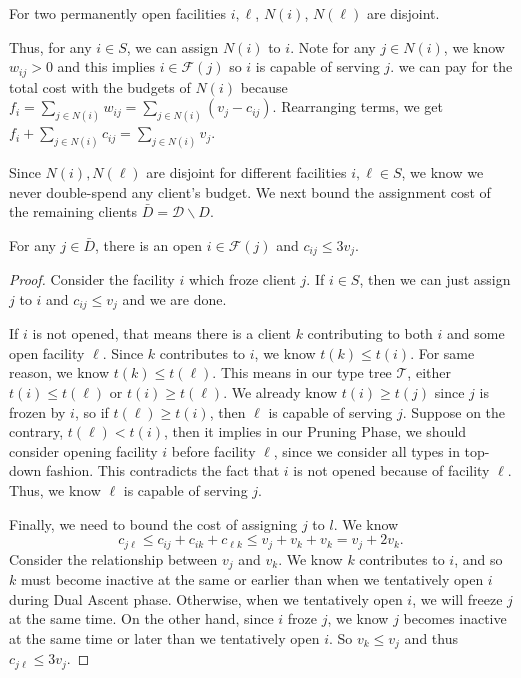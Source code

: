 \begin{fact}
For two permanently open facilities $i, \ell$, $N(i)$, $N(\ell)$ are disjoint.
\end{fact}

Thus, for any $i \in S$, we can assign $N(i)$ to $i$.
Note for any $j \in N(i)$, we know $w_{ij} > 0$ and this implies $i \in \mathcal{F}(j)$ so $i$ is capable of serving $j$.
we can pay for the total cost with the budgets of $N(i)$ because
%
$f_i = \sum_{j \in N(i)} w_{ij} = \sum_{j \in N(i)} (v_j - c_{ij})$.
%
Rearranging terms, we get
%
$f_i + \sum_{j \in N(i)} c_{ij} = \sum_{j \in N(i)} v_j$.

Since $N(i), N(\ell)$ are disjoint for different facilities $i, \ell \in S$, we know we never double-spend any client's budget.
%
We next bound the assignment cost of the remaining clients $\bar D = \mathcal{D} \backslash D$.
\begin{lem}
For any $j \in \bar D$, there is an open $i \in \mathcal{F}(j)$ and $c_{ij} \le 3v_j$.
\end{lem}
\begin{proof}
Consider the facility $i$ which froze client $j$. If $i \in S$, then we can just assign $j$ to $i$ and $c_{ij} \le v_j$ and we are done.

If $i$ is not opened, that means there is a client $k$ contributing to both $i$ and some open facility $\ell$. Since $k$ contributes to $i$, we know $t(k) \le t(i)$. For same reason, we know $t(k) \le t(\ell)$. This means in our type tree $\mathcal{T}$, either $t(i) \le t(\ell)$ or $t(i) \ge t(\ell)$.
We already know $t(i) \ge t(j)$ since $j$ is frozen by $i$, so if $t(\ell) \ge t(i)$, then $\ell$ is capable of serving $j$.
Suppose on the contrary, $t(\ell) < t(i)$, then it implies in our Pruning Phase, we should consider opening facility $i$ before facility $\ell$, since we consider all types in top-down fashion. This contradicts the fact that $i$ is not opened because of facility $\ell$.
Thus, we know $\ell$ is capable of serving $j$.

Finally, we need to bound the cost of assigning $j$ to $l$. We know
\[  c_{j\ell} \le c_{ij} + c_{ik} + c_{\ell k} \le v_j + v_k + v_k = v_j + 2v_k .   \]
Consider the relationship between $v_j$ and $v_k$.
We know $k$ contributes to $i$, and so $k$ must become inactive at the same or earlier than when we tentatively open $i$ during Dual Ascent phase.
Otherwise, when we tentatively open $i$, we will freeze $j$ at the same time.
On the other hand, since $i$ froze $j$, we know $j$ becomes inactive at the same time or later than we tentatively open $i$.
So $v_k \le v_j$ and thus
$c_{j\ell} \le 3v_j$.

\end{proof}

